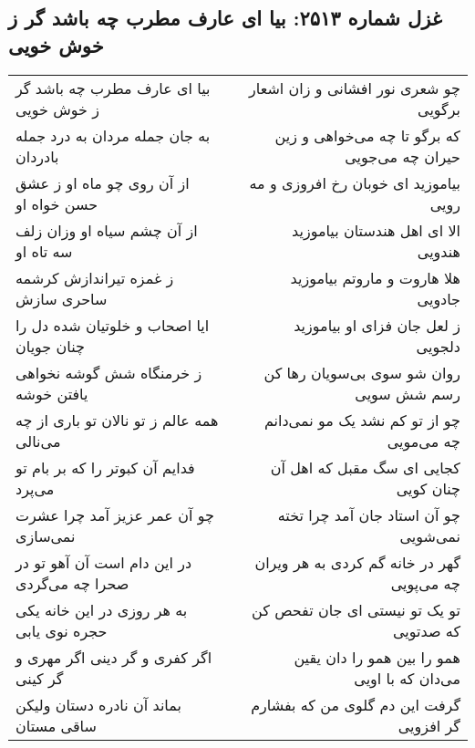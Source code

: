 \begin{center}
\section*{غزل شماره ۲۵۱۳: بیا ای عارف مطرب چه باشد گر ز خوش خویی}
\label{sec:2513}
\begin{longtable}{l p{0.5cm} r}
بیا ای عارف مطرب چه باشد گر ز خوش خویی
&&
چو شعری نور افشانی و زان اشعار برگویی
\\
به جان جمله مردان به درد جمله بادردان
&&
که برگو تا چه می‌خواهی و زین حیران چه می‌جویی
\\
از آن روی چو ماه او ز عشق حسن خواه او
&&
بیاموزید ای خوبان رخ افروزی و مه رویی
\\
از آن چشم سیاه او وزان زلف سه تاه او
&&
الا ای اهل هندستان بیاموزید هندویی
\\
ز غمزه تیراندازش کرشمه ساحری سازش
&&
هلا هاروت و ماروتم بیاموزید جادویی
\\
ایا اصحاب و خلوتیان شده دل را چنان جویان
&&
ز لعل جان فزای او بیاموزید دلجویی
\\
ز خرمنگاه شش گوشه نخواهی یافتن خوشه
&&
روان شو سوی بی‌سویان رها کن رسم شش سویی
\\
همه عالم ز تو نالان تو باری از چه می‌نالی
&&
چو از تو کم نشد یک مو نمی‌دانم چه می‌مویی
\\
فدایم آن کبوتر را که بر بام تو می‌پرد
&&
کجایی ای سگ مقبل که اهل آن چنان کویی
\\
چو آن عمر عزیز آمد چرا عشرت نمی‌سازی
&&
چو آن استاد جان آمد چرا تخته نمی‌شویی
\\
در این دام است آن آهو تو در صحرا چه می‌گردی
&&
گهر در خانه گم کردی به هر ویران چه می‌پویی
\\
به هر روزی در این خانه یکی حجره نوی یابی
&&
تو یک تو نیستی ای جان تفحص کن که صدتویی
\\
اگر کفری و گر دینی اگر مهری و گر کینی
&&
همو را بین همو را دان یقین می‌دان که با اویی
\\
بماند آن نادره دستان ولیکن ساقی مستان
&&
گرفت این دم گلوی من که بفشارم گر افزویی
\\
\end{longtable}
\end{center}
